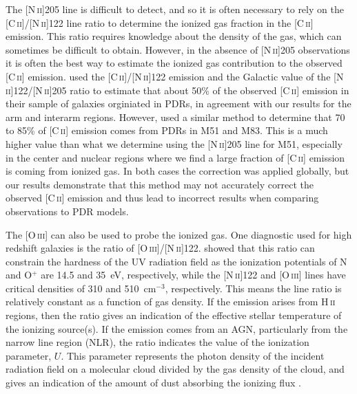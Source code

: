 \documentclass[preprint2]{aastex}
\begin{document}
The [N\,\textsc{ii}]205 line is difficult to detect, and so it is often necessary to rely on the [C\,\textsc{ii}]/[N\,\textsc{ii}]122 line ratio to determine the ionized gas fraction in the [C\,\textsc{ii}] emission.  This ratio requires knowledge about the density of the gas, which can sometimes be difficult to obtain.  However, in the absence of [N\,\textsc{ii}]205 observations it is often the best way to estimate the ionized gas contribution to the observed [C\,\textsc{ii}] emission.  \citet{2001ApJ...561..766M} used the [C\,\textsc{ii}]/[N\,\textsc{ii}]122 emission and the Galactic value of the [N\,\textsc{ii}]122/[N\,\textsc{ii}]205 ratio to estimate that about 50\% of the observed [C\,\textsc{ii}] emission in their sample of galaxies orginiated in PDRs, in agreement with our results for the arm and interarm regions.  However, \citet{2005A&A...441..961K} used a similar method to determine that 70 to 85\% of [C\,\textsc{ii}] emission comes from PDRs in M51 and M83.  This is a much higher value than what we determine using the [N\,\textsc{ii}]205 line for M51, especially in the center and nuclear regions where we find a large fraction of [C\,\textsc{ii}] emission is coming from ionized gas.  In both cases the correction was applied globally, but our results demonstrate that this method may not accurately correct the observed [C\,\textsc{ii}] emission and thus lead to incorrect results when comparing observations to PDR models.

The [O\,\textsc{iii}] can also be used to probe the ionized gas.  One diagnostic used for high redshift galaxies is the ratio of [O\,\textsc{iii}]/[N\,\textsc{ii}]122.  \citet{2011ApJ...740L..29F} showed that this ratio can constrain the hardness of the UV radiation field as the ionization potentials of N and O$^{+}$ are 14.5 and 35~eV, respectively, while the [N\,\textsc{ii}]122 and [O\,\textsc{iii}] lines have critical densities of 310 and 510~cm$^{-3}$, respectively.  This means the line ratio is relatively constant as a function of gas density.  If the emission arises from H\,\textsc{ii} regions, then the ratio gives an indication of the effective stellar temperature of the ionizing source(s).  If the emission comes from an AGN, particularly from the narrow line region (NLR), the ratio indicates the value of the ionization parameter, $U$.  This parameter represents the photon density of the incident radiation field on a molecular cloud divided by the gas density of the cloud, and gives an indication of the amount of dust absorbing the ionizing flux \citep{2003ApJ...594..758L,2009ApJ...701.1147A}.
\end{document}
